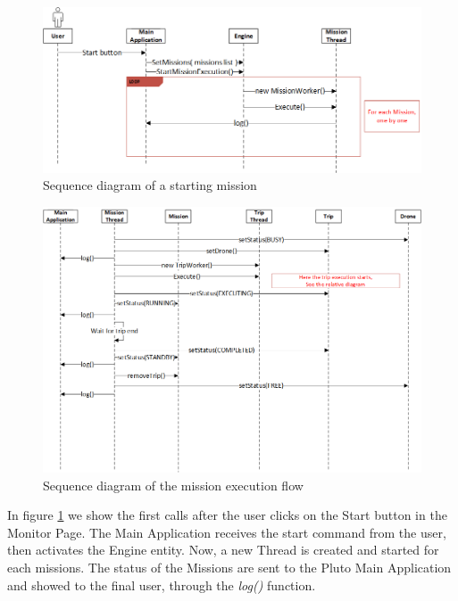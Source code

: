 \begin{figure}[h!]
  \centering
  \includegraphics[width=\linewidth]{pictures/Alfalfa_Sequence_MissionStart.png}
  \caption{Sequence diagram of a starting mission}
  \label{fig:alfalfaSequence1}
\end{figure}

\begin{figure}[h!]
  \centering
  \includegraphics[width=\linewidth]{pictures/Alfalfa_Sequence_MissionExecution.png}
  \caption{Sequence diagram of the mission execution flow}
  \label{fig:alfalfaSequence2}
\end{figure}

In figure \ref{fig:alfalfaSequence1} we show the first calls after the user clicks on the Start button in the Monitor Page.
The Main Application receives the start command from the user, then activates the Engine entity. Now, a new Thread is created and started for each missions. The status of the Missions are sent to the Pluto Main Application and showed to the final user, through the \textit{log()} function.
\\


